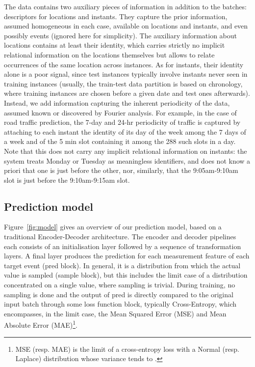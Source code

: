 \documentclass[a4paper]{article}
\begin{document}
The data contains two auxiliary pieces of information in addition to the batches: descriptors for locations and instants. They capture the prior information, assumed homogeneous in each case, available on locations and instants, and even possibly events (ignored here for simplicity). The auxiliary information about locations contains at least their identity, which carries strictly no implicit relational information on the locations themselves but allows to relate occurrences of the same location across instances. As for instants, their identity alone is a poor signal, since test instances typically involve instants never seen in training instances (usually, the train-test data partition is based on chronology, where training instances are chosen before a given date and test ones afterwards). Instead, we add information capturing the inherent periodicity of the data, assumed known or discovered by Fourier analysis. For example, in the case of road traffic prediction, the 7-day and 24-hr periodicity of traffic is captured by attaching to each instant the identity of its day of the week among the 7 days of a week and of the 5 min slot containing it among the 288 such slots in a day. Note that this does not carry any implicit relational information on instants: the system treats Monday or Tuesday as meaningless identifiers, and does not know a priori that one is just before the other, nor, similarly, that the 9:05am-9:10am slot is just before the 9:10am-9:15am slot.
\subsection{Prediction model}
Figure~\ref{fig:model} gives an overview of our prediction model, based on a traditional Encoder-Decoder architecture. The encoder and decoder pipelines each consists of an initialisation layer followed by a sequence of transformation layers. A final layer produces the prediction for each measurement feature of each target event ({\sc pred} block). In general, it is a distribution from which the actual value is sampled ({\sc sample} block), but this includes the limit case of a distribution concentrated on a single value, where sampling is trivial. During training, no sampling is done and the output of {\sc pred} is directly compared to the original input batch through some {\sc loss} function block, typically Cross-Entropy, which encompasses, in the limit case, the Mean Squared Error (MSE) and Mean Absolute Error (MAE)\footnote{MSE (resp. MAE) is the limit of a cross-entropy loss with a Normal (resp. Laplace) distribution whose variance tends to .}.
\end{document}
